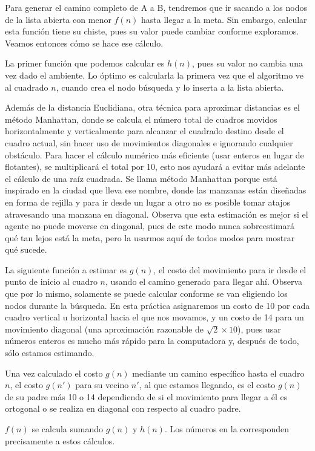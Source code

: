 Para generar el camino completo de A a B, tendremos que ir sacando a los nodos de la lista abierta con menor \(f(n)\) hasta llegar a la meta.  Sin embargo, calcular esta función tiene su chiste, pues su valor puede cambiar conforme exploramos.  Veamos entonces cómo se hace ese cálculo.

La primer función que podemos calcular es \(h(n)\), pues su valor no cambia una vez dado el ambiente.  Lo óptimo es calcularla la primera vez que el algoritmo ve al cuadrado \(n\), cuando crea el nodo búsqueda y lo inserta a la lista abierta.

Además de la distancia Euclidiana, otra técnica para aproximar distancias es el método Manhattan, donde se calcula el número total de cuadros movidos horizontalmente y verticalmente para alcanzar el cuadrado destino desde el cuadro actual, sin hacer uso de movimientos diagonales e ignorando cualquier obstáculo.  Para hacer el cálculo numérico más eficiente (usar enteros en lugar de flotantes), se multiplicará el total por 10, esto nos ayudará a evitar más adelante el cálculo de una raíz cuadrada. Se llama método Manhattan porque está inspirado en la ciudad que lleva ese nombre, donde las manzanas están diseñadas en forma de rejilla y para ir desde un lugar a otro no es posible tomar atajos atravesando una manzana en diagonal.  Observa que esta estimación es mejor si el agente no puede moverse en diagonal, pues de este modo nunca sobreestimará qué tan lejos está la meta, pero la usarmos aquí de todos modos para mostrar qué sucede.


La siguiente función a estimar es \(g(n)\), el costo del movimiento para ir desde el punto de inicio al cuadro \(n\), usando el camino generado para llegar ahí.  Observa que por lo mismo, solamente se puede calcular conforme se van eligiendo los nodos durante la búsqueda.  En esta práctica asignaremos un costo de 10 por cada cuadro vertical u horizontal hacia el que nos movamos, y un costo de 14 para un movimiento diagonal (una aproximación razonable de \(\sqrt{2}\times10\)), pues usar números enteros es mucho más rápido para la computadora y, después de todo, sólo estamos estimando.

Una vez calculado el costo \(g(n)\) mediante un camino específico hasta el cuadro $n$, el costo \(g(n')\) para su vecino $n'$, al que estamos llegando, es el costo \(g(n)\) de su padre más 10 o 14 dependiendo de si el movimiento para llegar a él es ortogonal o se realiza en diagonal con respecto al cuadro padre.

\(f(n)\) se calcula sumando \(g(n)\) y \(h(n)\).  Los números en la  corresponden precisamente a estos cálculos.

